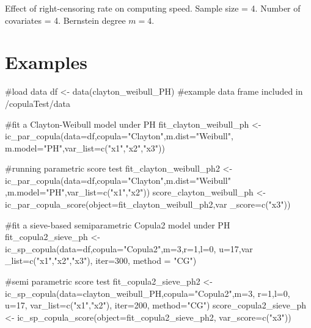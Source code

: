 \begin{table}[htbp]
\bigskip
\vspace{0.1cm}

\caption{Effect of right-censoring rate on computing speed. Sample size = 4. Number of covariates = 4. Bernstein degree $m=4$.}
\label{tab:effect_right_censor}

\bigskip
\vspace{0.1cm}

\caption{Comparison of Wald, score and Likelihood-ratio tests on computing speed under the same Null hypothesis. Sample size = 4. Number of covariates = 4. Bernstein degree $m=4$. Right-censoring rate = 25\%.}
\label{tab:test_compare}
\end{table}

\section{Examples}
\begin{example}
 #load data
 df <- data(clayton_weibull_PH) #example data frame included in /copulaTest/data
 
 #fit a Clayton-Weibull model under PH
 fit_clayton_weibull_ph <- ic_par_copula(data=df,copula="Clayton",m.dist="Weibull",
 m.model="PH",var_list=c("x1","x2","x3"))
 
 #running parametric score test
 fit_clayton_weibull_ph2 <- ic_par_copula(data=df,copula="Clayton",m.dist="Weibull"
 ,m.model="PH",var_list=c("x1","x2"))
 score_clayton_weibull_ph <- ic_par_copula_score(object=fit_clayton_weibull_ph2,var
 _score=c("x3"))
 
 #fit a sieve-based semiparametric Copula2 model under PH
 fit_copula2_sieve_ph <- ic_sp_copula(data=df,copula="Copula2",m=3,r=1,l=0, u=17,var
 _list=c("x1","x2","x3"), iter=300, method = "CG")
 
 #semi parametric score test
 fit_copula2_sieve_ph2 <- ic_sp_copula(data=clayton_weibull_PH,copula="Copula2",m=3,
 r=1,l=0, u=17, var_list=c("x1","x2"), iter=200, method="CG")
 score_copula2_sieve_ph <- ic_sp_copula_score(object=fit_copula2_sieve_ph2, 
 var_score=c("x3"))
\end{example}

